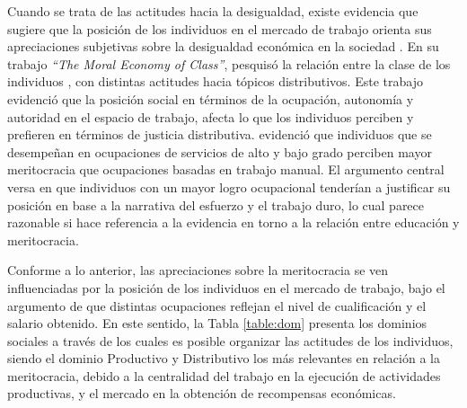 \documentclass[12pt]{article}
\begin{document}
Cuando se trata de las actitudes hacia la desigualdad, existe evidencia que sugiere que la posición de los individuos en el mercado de trabajo orienta sus apreciaciones subjetivas sobre la desigualdad económica en la sociedad \citet{Kulin2013}. En su trabajo \textit{``The Moral Economy of Class''},  \citet{Svallfors2006} pesquisó la relación entre la clase de los individuos \citep{Erikson1979}, con distintas actitudes hacia tópicos distributivos. Este trabajo evidenció que la posición social en términos de la ocupación, autonomía y autoridad en el espacio de trabajo, afecta lo que los individuos perciben y prefieren en términos de justicia distributiva. \citet{Sandoval2017} evidenció que individuos que se desempeñan en ocupaciones de servicios de alto y bajo grado perciben mayor meritocracia que ocupaciones basadas en trabajo manual. El argumento central versa en que individuos con un mayor logro ocupacional tenderían a justificar su posición en base a la narrativa del esfuerzo y el trabajo duro, lo cual parece razonable si hace referencia a la evidencia en torno a la relación entre educación y meritocracia.

Conforme a lo anterior, las apreciaciones sobre la meritocracia se ven influenciadas por la posición de los individuos en el mercado de trabajo, bajo el argumento de que distintas ocupaciones reflejan el nivel de cualificación y el salario obtenido. En este sentido, la Tabla \ref{table:dom} presenta los dominios sociales a través de los cuales es posible organizar las actitudes de los individuos, siendo el dominio Productivo y Distributivo los más relevantes en relación a la meritocracia, debido a la centralidad del trabajo en la ejecución de actividades productivas, y el mercado en la obtención de recompensas económicas.

\begin{table}[h!]
	\centering
	\caption[Tabla 1: Dominios actitudinales según Actividad]{Dominios actitudinales según Actividad}
	\label{table:dom}
\end{table}
      
\end{document}

